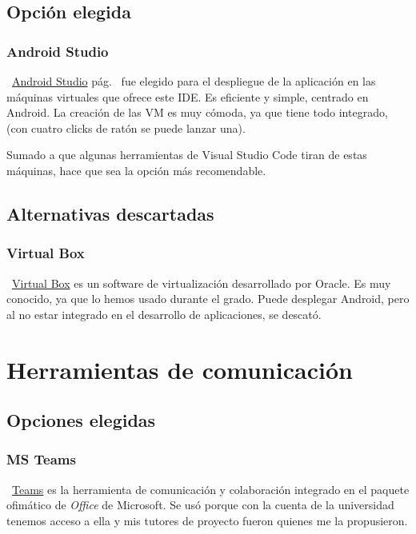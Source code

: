 \subsection{Opción elegida}

\subsubsection{Android Studio}
~\href{https://developer.android.com/studio}{Android Studio} pág.~\pageref{androidstudio} fue elegido para el despliegue de la aplicación en las máquinas virtuales que ofrece este IDE. Es eficiente y simple, centrado en Android. La creación de las VM es muy cómoda, ya que tiene todo integrado, (con cuatro clicks de ratón se puede lanzar una).

Sumado a que algunas herramientas de Visual Studio Code tiran de estas máquinas, hace que sea la opción más recomendable.

\subsection{Alternativas descartadas}

\subsubsection{Virtual Box}
~\href{https://www.virtualbox.org/}{Virtual Box} es un software de virtualización desarrollado por Oracle. Es muy conocido, ya que lo hemos usado durante el grado. Puede desplegar Android, pero al no estar integrado en el desarrollo de aplicaciones, se descató.


\section{Herramientas de comunicación}

\subsection{Opciones elegidas}

\subsubsection{MS Teams}
~\href{https://www.microsoft.com/es-ww/microsoft-365/microsoft-teams/download-app}{Teams} es la herramienta de comunicación y colaboración integrado en el paquete ofimático de \emph{Office} de Microsoft. Se usó porque con la cuenta de la universidad tenemos acceso a ella y mis tutores de proyecto fueron quienes me la propusieron.

